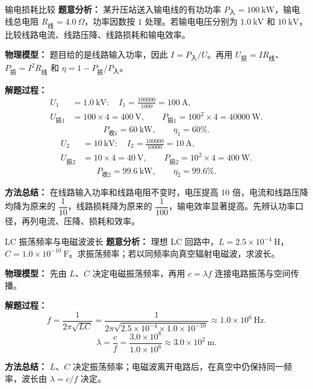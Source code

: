 \begin{examplebox}{输电损耗比较}
\textbf{题意分析：} 某升压站送入输电线的有功功率 $P_{\text{入}}=100\ \mathrm{kW}$，输电线总电阻 $R_{\text{线}}=4.0\ \Omega$，功率因数按 $1$ 处理。若输电电压分别为 $1.0\ \mathrm{kV}$ 和 $10\ \mathrm{kV}$，比较线路电流、线路压降、线路损耗和输电效率。

\textbf{物理模型：} 题目给的是线路输入功率，因此 $I=P_{\text{入}}/U$。再用
$U_{\text{损}}=IR_{\text{线}}$、$P_{\text{损}}=I^2R_{\text{线}}$ 和
$\eta=1-P_{\text{损}}/P_{\text{入}}$。

\begin{center}

\end{center}

\textbf{解题过程：}
\[
\begin{aligned}
U_1&=1.0\ \mathrm{kV}:\quad
I_1=\frac{100000}{1000}=100\ \mathrm A,\\
U_{\text{损}1}&=100\times4=400\ \mathrm V,\qquad
P_{\text{损}1}=100^2\times4=40000\ \mathrm W.
\end{aligned}
\]
\[
P_{\text{收}1}=60\ \mathrm{kW},\qquad \eta_1=60\%.
\]
\[
\begin{aligned}
U_2&=10\ \mathrm{kV}:\quad
I_2=\frac{100000}{10000}=10\ \mathrm A,\\
U_{\text{损}2}&=10\times4=40\ \mathrm V,\qquad
P_{\text{损}2}=10^2\times4=400\ \mathrm W.
\end{aligned}
\]
\[
P_{\text{收}2}=99.6\ \mathrm{kW},\qquad \eta_2=99.6\%.
\]

\textbf{方法总结：} 在线路输入功率和线路电阻不变时，电压提高 10 倍，电流和线路压降均降为原来的 $\dfrac1{10}$，线路损耗降为原来的 $\dfrac1{100}$，输电效率显著提高。先辨认功率口径，再列电流、压降、损耗和效率。
\end{examplebox}

\begin{examplebox}{LC 振荡频率与电磁波波长}
\textbf{题意分析：} 理想 LC 回路中，$L=2.5\times10^{-4}\ \mathrm H$，
$C=1.0\times10^{-10}\ \mathrm F$。求振荡频率；若以同频率向真空辐射电磁波，求波长。

\textbf{物理模型：} 先由 $L$、$C$ 决定电磁振荡频率，再用 $c=\lambda f$ 连接电路振荡与空间传播。

\textbf{解题过程：}
\[
f=\frac{1}{2\pi\sqrt{LC}}
=\frac{1}{2\pi\sqrt{2.5\times10^{-4}\times1.0\times10^{-10}}}
\approx1.0\times10^6\ \mathrm{Hz}.
\]
\[
\lambda=\frac{c}{f}
=\frac{3.0\times10^8}{1.0\times10^6}
\approx3.0\times10^2\ \mathrm m.
\]

\textbf{方法总结：} $L$、$C$ 决定振荡频率；电磁波离开电路后，在真空中仍保持同一频率，波长由 $\lambda=c/f$ 决定。
\end{examplebox}

